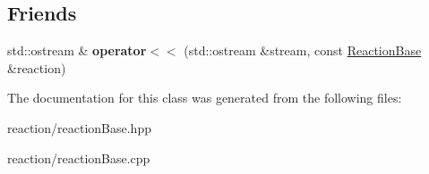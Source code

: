 \subsection*{Friends}
\begin{DoxyCompactItemize}
\item 
\mbox{\label{classReactionBase_a5ae4f004821b73cb5bd00c9bd7c0c910}} 
std\+::ostream \& {\bfseries operator$<$$<$} (std\+::ostream \&stream, const \mbox{\hyperlink{classReactionBase}{Reaction\+Base}} \&reaction)
\end{DoxyCompactItemize}


The documentation for this class was generated from the following files\+:\begin{DoxyCompactItemize}
\item 
reaction/reaction\+Base.\+hpp\item 
reaction/reaction\+Base.\+cpp\end{DoxyCompactItemize}
